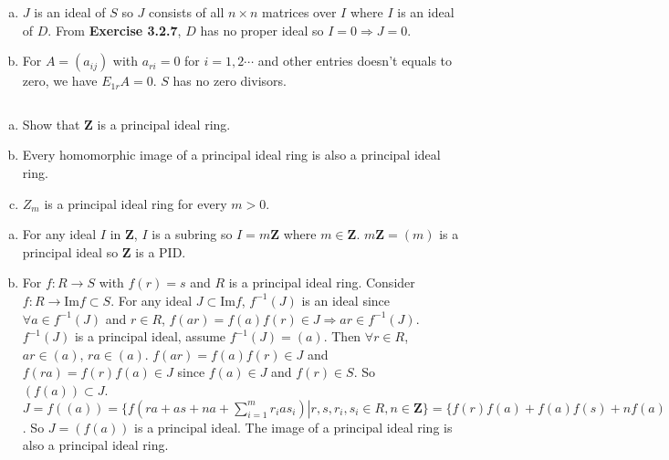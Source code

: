 \begin{answer}
    \begin{enumerate}[(a)]
        \item $J$ is an ideal of $S$ so $J$ consists of all $n\times n$ matrices over $I$ where $I$ is an ideal of $D$. From \textbf{Exercise 3.2.7}, $D$ has no proper ideal so $I=0\Rightarrow J=0$.
        \item For $A=(a_{ij})$ with $a_{ri}=0$ for $i=1,2\cdots$ and other entries doesn't equals to zero, we have $E_{1r}A=0$. $S$ has no zero divisors.
    \end{enumerate}
\end{answer}

$$ $$

\begin{ex}
    \begin{enumerate}[(a)]
        \item Show that $\mathbf{Z}$ is a principal ideal ring.
        \item Every homomorphic image of a principal ideal ring is also a principal ideal ring.
        \item $Z_{m}$ is a principal ideal ring for every $m>0$.
    \end{enumerate}
\end{ex}

\begin{answer}
    \begin{enumerate}[(a)]
        \item For any ideal $I$ in $\mathbf{Z}$, $I$ is a subring so $I=m\mathbf{Z}$ where $m\in \mathbf{Z}$. $m\mathbf{Z}=(m)$ is a principal ideal so $\mathbf{Z}$ is a PID.
        \item For $f:R\to S$ with $f(r)=s$ and $R$ is a principal ideal ring. Consider $f:R\to \mathrm{Im}f\subset S$. For any ideal $J\subset \mathrm{Im}f$, $f^{-1}(J)$ is an ideal since $\forall a\in f^{-1}(J)$ and $r\in R$, $f(ar)=f(a)f(r)\in J\Rightarrow ar\in f^{-1}(J)$. $f^{-1}(J)$ is a principal ideal, assume $f^{-1}(J)=(a)$. Then $\forall r\in R$, $ar\in (a)$, $ra\in (a)$. $f(ar)=f(a)f(r)\in J$ and $f(ra)=f(r)f(a)\in J$ since $f(a)\in J$ and $f(r)\in S$. So $(f(a))\subset J$. $J=f((a))=\{f(ra+as+na+\sum\limits_{i=1}^{m}r_{i}as_{i})| r, s, r_{i}, s_{i}\in R, n\in \mathbf{Z}\}=\{f(r)f(a)+f(a)f(s)+nf(a)+\sum\limits_{i=1}^{m}f(r_{i})f(a_{i})f(s_{i})| r, s, r_{i}, s_{i}\in R, n\in \mathbf{Z}\}\subset (f(a))$. So $J=(f(a))$ is a principal ideal. The image of a principal ideal ring is also a principal ideal ring.
    \end{enumerate}
\end{answer}

